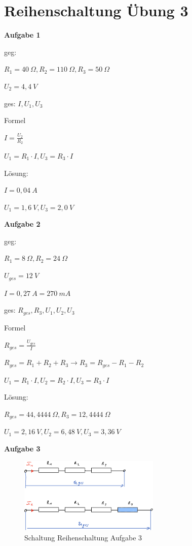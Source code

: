 \section{Reihenschaltung Übung 3}\label{reihenschaltung-uebung-3}

\textbf{Aufgabe 1}

geg:

$R_1 = 40~\Omega, R_2 = 110~\Omega, R_3 = 50~\Omega$

$U_2 = 4,4~V$

ges: $I, U_1, U_3$

Formel

$I = \frac{U_2}{R_2}$

$U_1 = R_1 \cdot I, U_3 = R_3 \cdot I$

Lösung:

$I = 0,04~A$

$U_1 = 1,6~V, U_3 = 2,0~V$

\textbf{Aufgabe 2}

geg:

$R_1 = 8~\Omega, R_2 = 24~\Omega$

$U_{ges} = 12~V$

$I = 0,27~A = 270~mA$

ges: $R_{ges}, R_3, U_1, U_2, U_3$

Formel

$R_{ges} = \frac{U_{ges}}{I}$

$R_{ges} = R_1 + R_2 + R_3 \to R_3 = R_{ges} - R_1 - R_2$

$U_1 = R_1 \cdot I, U_2 = R_2 \cdot I, U_3 = R_3 \cdot I$

Lösung:

$R_{ges} = 44,4444~\Omega, R_3 = 12,4444~\Omega$

$U_1 = 2,16~V, U_2 = 6,48~V, U_3 = 3,36~V$

\newpage

\textbf{Aufgabe 3}

\begin{figure}[!ht]%
\centering
\includegraphics[width=0.6\textwidth]{images/Skizze/22_FM_Nr3_Reihenschaltung_Aufg3_Skizze.pdf}
\caption{Schaltung Reihenschaltung Aufgabe 3}
\end{figure}

